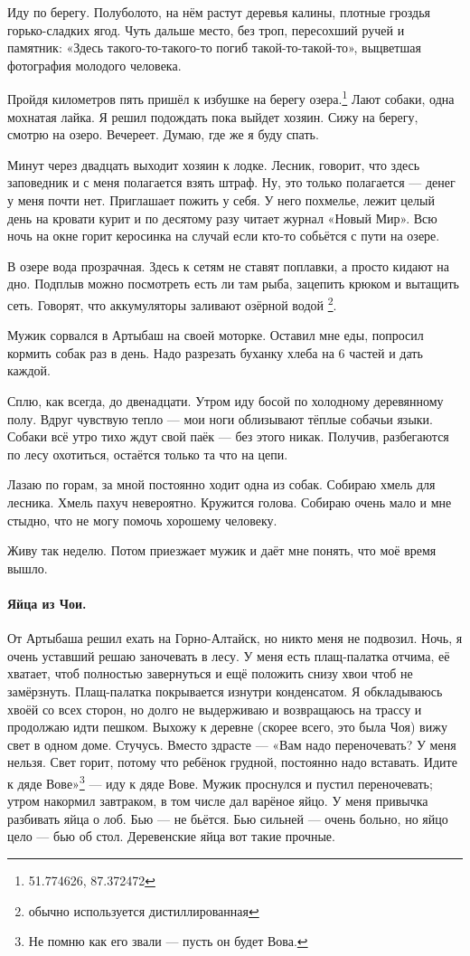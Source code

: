 \documentclass{book}
\begin{document}
Иду по берегу.
Полуболото, на нём растут деревья калины,
плотные гроздья горько-сладких ягод.
Чуть дальше место, без троп, пересохший ручей и памятник:
«Здесь такого-то-такого-то погиб такой-то-такой-то»,
выцветшая фотография молодого человека.

Пройдя километров пять пришёл к избушке на берегу озера.\footnote{51.774626, 87.372472}
Лают собаки, одна мохнатая лайка.
Я решил подождать пока выйдет хозяин.
Сижу на берегу, смотрю на озеро.
Вечереет.
Думаю, где же я буду спать.

Минут через двадцать выходит хозяин к лодке.
Лесник, говорит, что здесь заповедник и с меня полагается взять штраф.
Ну, это только полагается --- денег у меня почти нет.
Приглашает пожить у себя.
У него похмелье, лежит целый день на кровати курит и по десятому разу читает журнал «Новый Мир».
Всю ночь на окне горит керосинка на случай если кто-то собьётся с пути на озере.

В озере вода прозрачная.
Здесь к сетям не ставят поплавки, а просто кидают на дно.
Подплыв можно посмотреть есть ли там рыба, зацепить крюком и вытащить сеть.
Говорят, что аккумуляторы заливают озёрной водой%
\footnote{обычно используется дистиллированная}.

Мужик сорвался в Артыбаш на своей моторке.
Оставил мне еды, попросил кормить собак раз в день.
Надо разрезать буханку хлеба на 6 частей и дать каждой.

Сплю, как всегда, до двенадцати.
Утром иду босой по холодному деревянному полу.
Вдруг чувствую тепло --- мои ноги облизывают тёплые собачьи языки.
Собаки всё утро тихо ждут свой паёк --- без этого никак.
Получив, разбегаются по лесу охотиться,
остаётся только та что на цепи.

Лазаю по горам, за мной постоянно ходит одна из собак.
Собираю хмель для лесника.
Хмель пахуч невероятно.
Кружится голова.
Собираю очень мало и мне стыдно, что не могу помочь хорошему человеку.

Живу так неделю.
Потом приезжает мужик и даёт мне понять, что моё время вышло.

\paragraph{Яйца из Чои.}
От Артыбаша решил ехать на Горно-Алтайск, но никто меня не подвозил.
Ночь, я очень уставший решаю заночевать в лесу.
У меня есть плащ-палатка отчима, её хватает, чтоб полностью завернуться и ещё положить снизу хвои чтоб не замёрзнуть.
Плащ-палатка покрывается изнутри конденсатом.
Я обкладываюсь хвоёй со всех сторон, но долго не выдерживаю и возвращаюсь на трассу и продолжаю идти пешком.
Выхожу к деревне (скорее всего, это была Чоя) вижу свет в одном доме.
Стучусь.
Вместо здрасте --- «Вам надо переночевать?
У меня нельзя.
Свет горит, потому что ребёнок грудной, постоянно надо вставать.
Идите к дяде Вове»\footnote{Не помню как его звали --- пусть он будет Вова.} --- иду к дяде Вове.
Мужик проснулся и пустил переночевать; утром накормил завтраком, в том числе дал варёное яйцо.
У меня привычка разбивать яйца о лоб.
Бью --- не бьётся. 
Бью сильней --- очень больно, но яйцо цело --- бью об стол.
Деревенские яйца вот такие прочные.
\end{document}
